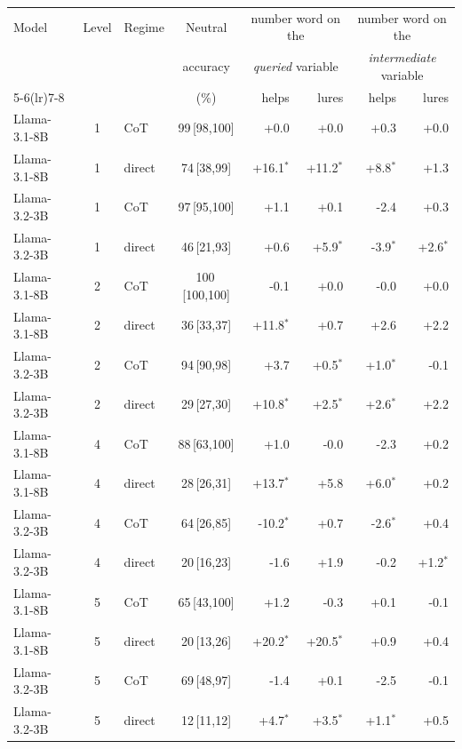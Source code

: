 \begin{tabular}{lclcrrrr}
\toprule
Model & Level & Regime & Neutral & \multicolumn{2}{c}{number word on the} & \multicolumn{2}{c}{number word on the} \\
& & & accuracy & \multicolumn{2}{c}{\emph{queried} variable} & \multicolumn{2}{c}{\emph{intermediate} variable} \\
\cmidrule(lr){5-6}\cmidrule(lr){7-8}
& & & (\%) & helps & lures & helps & lures \\
\midrule
Llama-3.1-8B & 1 & CoT & 99\,{\scriptsize[98,100]} & +0.0 & +0.0 & +0.3 & +0.0 \\
Llama-3.1-8B & 1 & direct & 74\,{\scriptsize[38,99]} & +16.1$^{*}$ & +11.2$^{*}$ & +8.8$^{*}$ & +1.3 \\
\addlinespace
Llama-3.2-3B & 1 & CoT & 97\,{\scriptsize[95,100]} & +1.1 & +0.1 & -2.4 & +0.3 \\
Llama-3.2-3B & 1 & direct & 46\,{\scriptsize[21,93]} & +0.6 & +5.9$^{*}$ & -3.9$^{*}$ & +2.6$^{*}$ \\
\addlinespace
Llama-3.1-8B & 2 & CoT & 100\,{\scriptsize[100,100]} & -0.1 & +0.0 & -0.0 & +0.0 \\
Llama-3.1-8B & 2 & direct & 36\,{\scriptsize[33,37]} & +11.8$^{*}$ & +0.7 & +2.6 & +2.2 \\
\addlinespace
Llama-3.2-3B & 2 & CoT & 94\,{\scriptsize[90,98]} & +3.7 & +0.5$^{*}$ & +1.0$^{*}$ & -0.1 \\
Llama-3.2-3B & 2 & direct & 29\,{\scriptsize[27,30]} & +10.8$^{*}$ & +2.5$^{*}$ & +2.6$^{*}$ & +2.2 \\
\addlinespace
Llama-3.1-8B & 4 & CoT & 88\,{\scriptsize[63,100]} & +1.0 & -0.0 & -2.3 & +0.2 \\
Llama-3.1-8B & 4 & direct & 28\,{\scriptsize[26,31]} & +13.7$^{*}$ & +5.8 & +6.0$^{*}$ & +0.2 \\
\addlinespace
Llama-3.2-3B & 4 & CoT & 64\,{\scriptsize[26,85]} & -10.2$^{*}$ & +0.7 & -2.6$^{*}$ & +0.4 \\
Llama-3.2-3B & 4 & direct & 20\,{\scriptsize[16,23]} & -1.6 & +1.9 & -0.2 & +1.2$^{*}$ \\
\addlinespace
Llama-3.1-8B & 5 & CoT & 65\,{\scriptsize[43,100]} & +1.2 & -0.3 & +0.1 & -0.1 \\
Llama-3.1-8B & 5 & direct & 20\,{\scriptsize[13,26]} & +20.2$^{*}$ & +20.5$^{*}$ & +0.9 & +0.4 \\
\addlinespace
Llama-3.2-3B & 5 & CoT & 69\,{\scriptsize[48,97]} & -1.4 & +0.1 & -2.5 & -0.1 \\
Llama-3.2-3B & 5 & direct & 12\,{\scriptsize[11,12]} & +4.7$^{*}$ & +3.5$^{*}$ & +1.1$^{*}$ & +0.5 \\
\bottomrule
\end{tabular}
